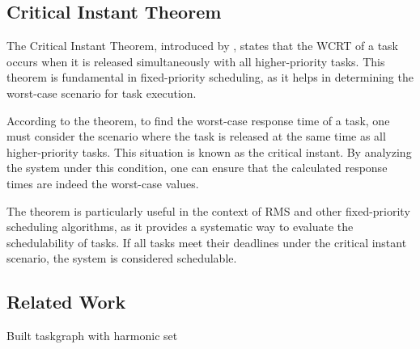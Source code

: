\subsection{Critical Instant Theorem}\label{sec:critical_instant_theorem}
The Critical Instant Theorem, introduced by \textcite{liuSchedulingAlgorithmsMultiprogramming1973}, states that the \ac{WCRT} of a task occurs when it is released simultaneously with all higher-priority tasks.
This theorem is fundamental in fixed-priority scheduling, as it helps in determining the worst-case scenario for task execution.

According to the theorem, to find the worst-case response time of a task, one must consider the scenario where the task is released at the same time as all higher-priority tasks. 
This situation is known as the critical instant. By analyzing the system under this condition, one can ensure that the calculated response times are indeed the worst-case values.

The theorem is particularly useful in the context of \ac{RMS} and other fixed-priority scheduling algorithms, as it provides a systematic way to evaluate the schedulability of tasks. 
If all tasks meet their deadlines under the critical instant scenario, the system is considered schedulable.

\subsection{Related Work}
\label{sec:related_work}
\todo{}
\cite{dar-tzenpengAssignmentSchedulingCommunicating1997} Built taskgraph with harmonic set 